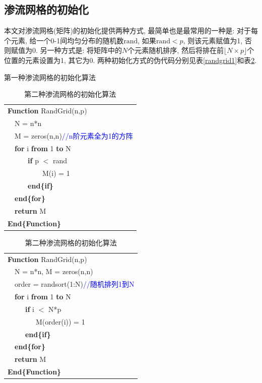 \documentclass[11pt,a4paper,boxed]{caspset}
\begin{document}
\subsection{渗流网格的初始化}
本文对渗流网格(矩阵)的初始化提供两种方式, 最简单也是最常用的一种是: 对于每个元素, 给一个0-1间均匀分布的随机数$\mathrm{rand}$, 如果$\textrm{rand}<p$, 则该元素赋值为1, 否则赋值为0.
另一种方式是: 将矩阵中的$N$个元素随机排序, 然后将排在前$\lfloor N\times p\rfloor$个位置的元素设置为1, 其它为0. 两种初始化方式的伪代码分别见表\ref{randgrid1}和表\ref{randgird2}.
\begin{table}[!htb]
\begin{minipage}[b]{.5\textwidth}
\centering
\caption{\label{randgrid1}第一种渗流网格的初始化算法}
\begin{tabular}{lllllll}
\hline
\multicolumn{7}{l}{\textbf{Function} RandGrid(n,p)} \\
 & \multicolumn{6}{l}{N = n*n }\\
 & \multicolumn{6}{l}{M = zeros(n,n)\textcolor{blue}{//n阶元素全为1的方阵}} \\
 &  \multicolumn{5}{l}{\textbf{for} i  \textbf{from} 1 \textbf{to} N} \\
 &  &  \multicolumn{3}{l}{\textbf{if} p $<$ rand } \\
 &  &  \multicolumn{2}{l}{} & M(i) = 1 \\
 &  &  \multicolumn{3}{l}{\textbf{end\{if\}}} \\
 & \multicolumn{5}{l}{\textbf{end\{for\}}} \\
   & \multicolumn{5}{l}{\textbf{return} M} \\
\multicolumn{7}{l}{\textbf{End\{Function\}}} \\
\hline
\end{tabular}
\end{minipage}%
\begin{minipage}[b]{.5\textwidth}
\centering
\caption{\label{randgird2}第二种渗流网格的初始化算法}
\begin{tabular}{lllllll}
\hline
\multicolumn{7}{l}{\textbf{Function} RandGrid(n,p)} \\
 & \multicolumn{6}{l}{N = n*n, M = zeros(n,n)}\\
 & \multicolumn{6}{l}{ order = randsort(1:N)\textcolor{blue}{//随机排列1到N} } \\
 &  \multicolumn{5}{l}{\textbf{for} i  \textbf{from} 1 \textbf{to} N} \\
 &  &  \multicolumn{3}{l}{\textbf{if} i $<$ N*p } \\
 &  &  \multicolumn{2}{l}{} & M(order(i)) = 1 \\
 &  &  \multicolumn{3}{l}{\textbf{end\{if\}}} \\
 & \multicolumn{5}{l}{\textbf{end\{for\}}} \\
  & \multicolumn{5}{l}{\textbf{return} M} \\
\multicolumn{7}{l}{\textbf{End\{Function\}}} \\
\hline
\end{tabular}
\end{minipage}
\end{table}\\
\end{document}
